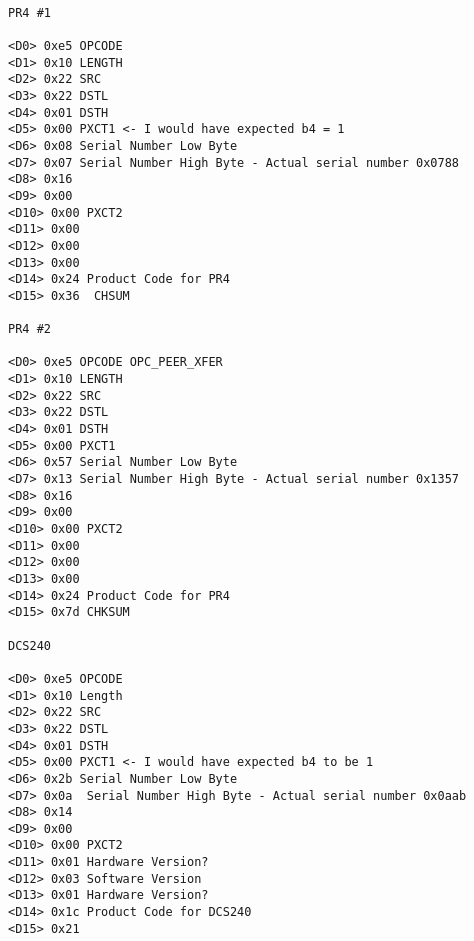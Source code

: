 \begin{verbatim}

PR4 #1

<D0> 0xe5 OPCODE
<D1> 0x10 LENGTH
<D2> 0x22 SRC
<D3> 0x22 DSTL
<D4> 0x01 DSTH
<D5> 0x00 PXCT1 <- I would have expected b4 = 1
<D6> 0x08 Serial Number Low Byte
<D7> 0x07 Serial Number High Byte - Actual serial number 0x0788
<D8> 0x16 
<D9> 0x00 
<D10> 0x00 PXCT2
<D11> 0x00 
<D12> 0x00 
<D13> 0x00 
<D14> 0x24 Product Code for PR4
<D15> 0x36  CHSUM

PR4 #2

<D0> 0xe5 OPCODE OPC_PEER_XFER
<D1> 0x10 LENGTH
<D2> 0x22 SRC
<D3> 0x22 DSTL
<D4> 0x01 DSTH
<D5> 0x00 PXCT1 
<D6> 0x57 Serial Number Low Byte
<D7> 0x13 Serial Number High Byte - Actual serial number 0x1357
<D8> 0x16 
<D9> 0x00 
<D10> 0x00 PXCT2
<D11> 0x00 
<D12> 0x00 
<D13> 0x00 
<D14> 0x24 Product Code for PR4
<D15> 0x7d CHKSUM

DCS240

<D0> 0xe5 OPCODE
<D1> 0x10 Length
<D2> 0x22 SRC
<D3> 0x22 DSTL
<D4> 0x01 DSTH
<D5> 0x00 PXCT1 <- I would have expected b4 to be 1
<D6> 0x2b Serial Number Low Byte
<D7> 0x0a  Serial Number High Byte - Actual serial number 0x0aab
<D8> 0x14 
<D9> 0x00 
<D10> 0x00 PXCT2
<D11> 0x01 Hardware Version?
<D12> 0x03 Software Version
<D13> 0x01 Hardware Version?
<D14> 0x1c Product Code for DCS240
<D15> 0x21

\end{verbatim}
